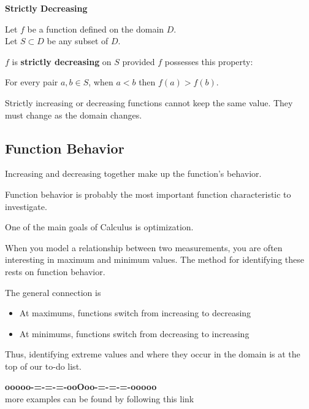 \documentclass{ximera}
\begin{document}
\begin{definition} \textbf{\textcolor{green!50!black}{Strictly Decreasing}} 


Let $f$ be a function defined on the domain $D$. \\
Let $S \subset D$ be any subset of $D$.

$f$ is \textbf{strictly decreasing} on $S$ provided $f$ possesses this property:  


\begin{center}
For every pair $a, b \in S$, when $a < b$ then $f(a) > f(b)$.
\end{center}

\end{definition}




Strictly increasing or decreasing functions cannot keep the same value.  They must change as the domain changes.






\subsection*{Function Behavior}

Increasing and decreasing together make up the function's behavior.

Function behavior is probably the most important function characteristic to investigate.

One of the main goals of Calculus is optimization.

When you model a relationship between two measurements, you are often interesting in maximum and minimum values.  The method for identifying these rests on function behavior.


The general connection is
\begin{itemize}
\item At maximums, functions switch from increasing to decreasing
\item At minimums, functions switch from decreasing to increasing
\end{itemize}

Thus, identifying extreme values and where they occur in the domain is at the top of our to-do list.






\begin{onlineOnly}
\begin{center}
\textbf{\textcolor{green!50!black}{ooooo-=-=-=-ooOoo-=-=-=-ooooo}} \\

more examples can be found by following this link\\ 

\end{center}
\end{onlineOnly}
\end{document}
